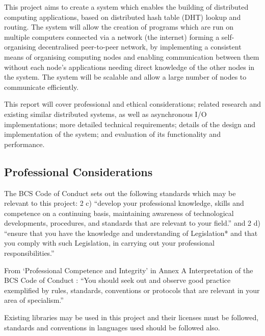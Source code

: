 \documentclass{article}
\begin{document}
This project aims to create a system which enables the building of distributed computing applications, based on distributed hash table (DHT) lookup and routing. The system will allow the creation of programs which are run on multiple computers connected via a network (the internet) forming a self-organising decentralised peer-to-peer network, by implementing a consistent means of organising computing nodes and enabling communication between them without each node's applications needing direct knowledge of the other nodes in the system.
The system will be scalable and allow a large number of nodes to communicate efficiently.

This report will cover professional and ethical considerations; related research and existing similar distributed systems, as well as asynchronous I/O implementations; more detailed technical requirements; details of the design and implementation of the system; and evaluation of its functionality and performance.


\subsection{Professional Considerations}
The BCS Code of Conduct \cite{bcscoc} sets out the following standards which may be relevant to this project: 2 c) “develop your professional knowledge, skills and competence on a continuing basis, maintaining awareness of technological developments, procedures, and standards that are relevant to your field.” and 2 d) “ensure that you have the knowledge and understanding of Legislation* and that you comply with such Legislation, in carrying out your professional responsibilities.”

From ‘Professional Competence and Integrity’ in Annex A Interpretation of the BCS Code of Conduct \cite{bcscoca}: “You should seek out and observe good practice exemplified by rules, standards, conventions or protocols that are relevant in your area of specialism.”

Existing libraries may be used in this project and their licenses must be followed, standards and conventions in languages used should be followed also.


\end{document}
